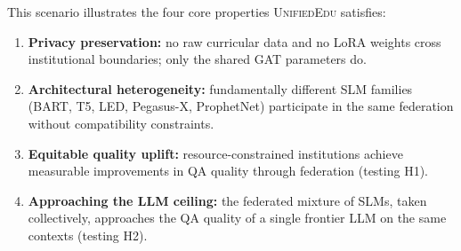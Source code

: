 \documentclass[11pt]{article}
\theoremstyle{plain}
\theoremstyle{definition}
\theoremstyle{remark}
\newcommand{\UniEdu}{\textsc{UnifiedEdu}}
\begin{document}
This scenario illustrates the four core properties
\UniEdu{} satisfies:
\begin{enumerate}[leftmargin=1.5em, itemsep=2pt]
  \item \textbf{Privacy preservation:} no raw
  curricular data and no LoRA weights cross
  institutional boundaries; only the shared GAT
  parameters do.
  \item \textbf{Architectural heterogeneity:}
  fundamentally different SLM families (BART, T5,
  LED, Pegasus-X, ProphetNet) participate in the
  same federation without compatibility constraints.
  \item \textbf{Equitable quality uplift:}
  resource-constrained institutions achieve
  measurable improvements in QA quality through
  federation (testing H1).
  \item \textbf{Approaching the LLM ceiling:} the
  federated mixture of SLMs, taken collectively,
  approaches the QA quality of a single frontier LLM
  on the same contexts (testing H2).
\end{enumerate}
\end{document}
